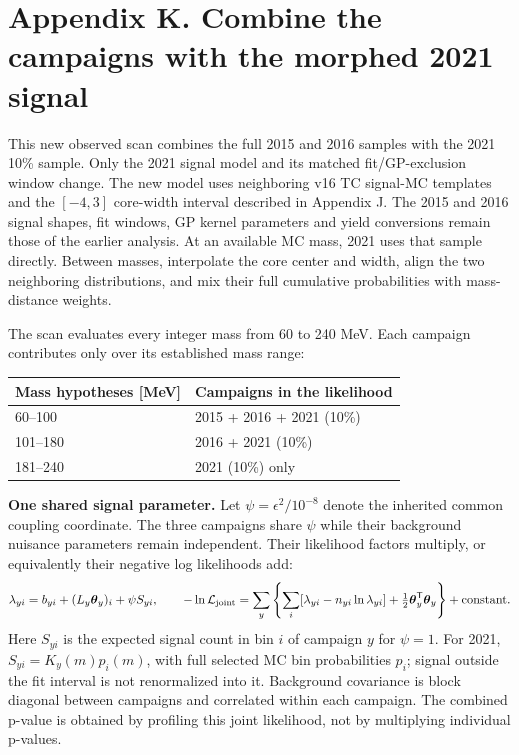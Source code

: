\documentclass[11pt]{article}
\begin{document}
\section*{Appendix K. Combine the campaigns with the morphed 2021 signal}

This new observed scan combines the full 2015 and 2016 samples with the 2021 10\% sample. Only the 2021 signal model and its matched fit/GP-exclusion window change. The new model uses neighboring v16 TC signal-MC templates and the $[-4,3]$ core-width interval described in Appendix J. The 2015 and 2016 signal shapes, fit windows, GP kernel parameters and yield conversions remain those of the earlier analysis. At an available MC mass, 2021 uses that sample directly. Between masses, interpolate the core center and width, align the two neighboring distributions, and mix their full cumulative probabilities with mass-distance weights.

The scan evaluates every integer mass from 60 to 240 MeV. Each campaign contributes only over its established mass range:
\begin{center}\small\begin{tabular}{ll}\toprule
Mass hypotheses [MeV] & Campaigns in the likelihood\\\midrule
60--100 & 2015 + 2016 + 2021 (10\%)\\
101--180 & 2016 + 2021 (10\%)\\
181--240 & 2021 (10\%) only\\
\bottomrule\end{tabular}\end{center}
\textbf{One shared signal parameter.} Let $\psi=\epsilon^2/10^{-8}$ denote the inherited common coupling coordinate. The three campaigns share $\psi$ while their background nuisance parameters remain independent. Their likelihood factors multiply, or equivalently their negative log likelihoods add:
\[
 \lambda_{yi}=b_{yi}+(L_y\boldsymbol\theta_y)_i+\psi S_{yi},\qquad
 -\ln\mathcal L_{\rm joint}=\sum_y\left\{\sum_i[\lambda_{yi}-n_{yi}\ln\lambda_{yi}]
 +\tfrac12\boldsymbol\theta_y^{\mathsf T}\boldsymbol\theta_y\right\}+\mathrm{constant}.
\]
Here $S_{yi}$ is the expected signal count in bin $i$ of campaign $y$ for $\psi=1$. For 2021, $S_{yi}=K_y(m)p_i(m)$, with full selected MC bin probabilities $p_i$; signal outside the fit interval is not renormalized into it. Background covariance is block diagonal between campaigns and correlated within each campaign. The combined p-value is obtained by profiling this joint likelihood, not by multiplying individual p-values.
\end{document}
